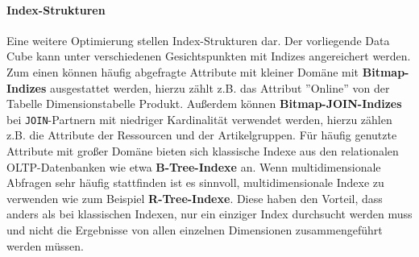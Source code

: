 \paragraph{Index-Strukturen}Eine weitere Optimierung stellen Index-Strukturen dar. 
Der vorliegende Data Cube kann unter verschiedenen Gesichtspunkten mit Indizes angereichert werden.
Zum einen können häufig abgefragte Attribute mit kleiner Domäne mit \textbf{Bitmap-Indizes} ausgestattet werden, hierzu zählt z.B. das Attribut ''Online'' von der Tabelle Dimensionstabelle Produkt.
Außerdem können \textbf{Bitmap-JOIN-Indizes} bei \texttt{JOIN}-Partnern mit niedriger Kardinalität verwendet werden, hierzu zählen z.B. die Attribute der Ressourcen und der Artikelgruppen.
Für häufig genutzte Attribute mit großer Domäne bieten sich klassische Indexe aus den relationalen OLTP-Datenbanken wie etwa \textbf{B-Tree-Indexe} an.
Wenn multidimensionale Abfragen sehr häufig stattfinden ist es sinnvoll, multidimensionale Indexe zu verwenden wie zum Beispiel \textbf{R-Tree-Indexe}. 
Diese haben den Vorteil, dass anders als bei klassischen Indexen, nur ein einziger Index durchsucht werden muss und nicht die Ergebnisse von allen einzelnen Dimensionen zusammengeführt werden müssen.
